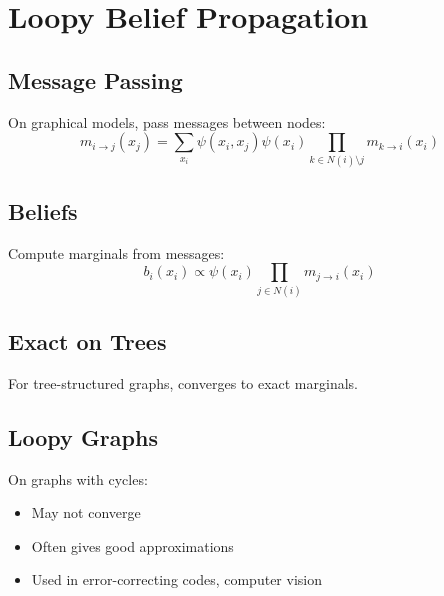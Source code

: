 
\section{Loopy Belief Propagation }
\label{sec:loopy-bp}

\subsection{Message Passing}

On graphical models, pass messages between nodes:
\begin{equation}
m_{i \to j}(x_j) = \sum_{x_i} \psi(x_i, x_j) \psi(x_i) \prod_{k \in N(i) \setminus j} m_{k \to i}(x_i)
\end{equation}

\subsection{Beliefs}

Compute marginals from messages:
\begin{equation}
b_i(x_i) \propto \psi(x_i) \prod_{j \in N(i)} m_{j \to i}(x_i)
\end{equation}

\subsection{Exact on Trees}

For tree-structured graphs, converges to exact marginals.

\subsection{Loopy Graphs}

On graphs with cycles:
\begin{itemize}
    \item May not converge
    \item Often gives good approximations
    \item Used in error-correcting codes, computer vision
\end{itemize}




